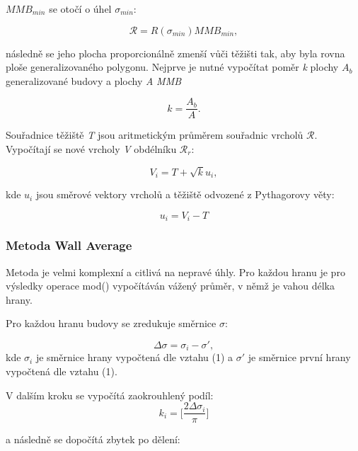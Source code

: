 \documentclass[11pt]{article}
\begin{document}
		\textit{$MMB_{min}$} se otočí o úhel $ \sigma_{min} $:  
		
		\begin{equation}
		\mathcal{R} = R(\sigma_{min})MMB_{min}, 
		\end{equation}
		
		následně se jeho plocha proporcionálně zmenší vůči těžišti tak, aby byla rovna ploše generalizovaného polygonu. Nejprve je nutné vypočítat poměr \textit{k} plochy \textit{$A_b$} generalizované budovy a plochy \textit{A} \textit{MMB}
		
		\begin{equation}
			k = \dfrac{A_b}{A}.
		\end{equation}
		
		Souřadnice těžiště \textit{T} jsou aritmetickým průměrem souřadnic vrcholů $\mathcal{R}$. Vypočítají se nové vrcholy \textit{V} obdélníku $\mathcal{R}_r$:
		
		\begin{equation}
			V_i = T + \sqrt{k}u_i, 
		\end{equation}
	
		kde \textit{$u_i$} jsou směrové vektory vrcholů a těžiště odvozené z Pythagorovy věty:
		
		\begin{equation}
			u_i = V_i - T 
		\end{equation}
	
	

		\subsubsection{Metoda Wall Average}
		Metoda je velmi komplexní a citlivá na nepravé úhly. Pro každou hranu je pro výsledky operace mod() vypočítáván vážený průměr, v němž je vahou délka hrany.
		
		Pro každou hranu budovy se zredukuje směrnice $\sigma$:
		
		\begin{equation}
			\Delta\sigma = \sigma_i - \sigma',
		\end{equation} 
		kde $ \sigma_i $ je směrnice hrany vypočtená dle vztahu (1) a $ \sigma' $ je směrnice první hrany vypočtená dle vztahu (1). 
		
		V dalším kroku se vypočítá zaokrouhlený podíl:
		\begin{equation}
			k_i = \bigg[\frac{2\Delta\sigma_i}{\pi}\bigg]
		\end{equation}
		
		a následně se dopočítá zbytek po dělení:
		
\end{document}
